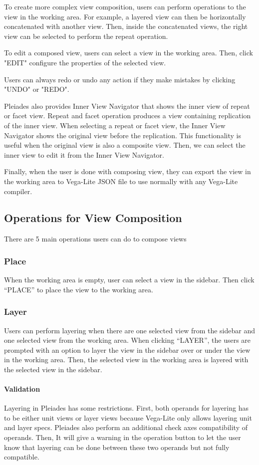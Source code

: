 \documentclass[journal]{vgtc}                %
\begin{document}
To create more complex view composition, users can perform operations to the view
in the working area. For example, a layered view can then be horizontally concatenated
with another view. Then, inside the concatenated views, the right view can be selected
to perform the repeat operation.

To edit a composed view, users can select a view in the working area. Then, click
"EDIT" configure the properties of the selected view.

Users can always redo or undo any action if they make mistakes by clicking "UNDO"
or "REDO".

Pleiades also provides Inner View Navigator that shows the inner view of repeat
or facet view. Repeat and facet operation produces a view containing replication
of the inner view. When selecting a repeat or facet view, the Inner View Navigator
shows the original view before the replication. This functionality is useful when
the original view is also a composite view. Then, we can select the inner view to
edit it from the Inner View Navigator.

Finally, when the user is done with composing view, they can export the view in
the working area to Vega-Lite JSON file to use normally with any Vega-Lite compiler.


\subsection{Operations for View Composition}
There are 5 main operations users can do to compose views

\subsubsection{Place}
When the working area is empty, user can select a view in the sidebar. Then click
“PLACE” to place the view to the working area.

\subsubsection{Layer}
Users can perform layering when there are one selected view from the sidebar and
one selected view from the working area. When clicking “LAYER”, the users are
prompted with an option to layer the view in the sidebar over or under the view
in the working area. Then, the selected view in the working area is layered with
the selected view in the sidebar.

\paragraph{Validation} Layering in Pleiades has some restrictions. First, both
operands for layering has to be either unit views or layer views because
Vega-Lite only allows layering unit and layer specs. Pleiades also perform an
additional check axes compatibility of operands. Then, It will give a warning
in the operation button to let the user know that layering can be done between
these two operands but not fully compatible.
\end{document}
